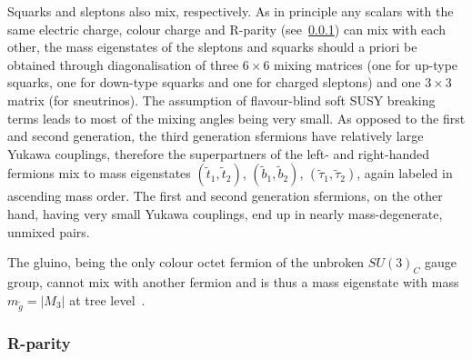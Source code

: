 %

Squarks and sleptons also mix, respectively. As in principle any scalars with the same electric charge, colour charge and R-parity (see~\cref{sec:rparity}) can mix with each other, the mass eigenstates of the sleptons and squarks should a priori be obtained through diagonalisation of three $6\times 6$ mixing matrices (one for up-type squarks, one for down-type squarks and one for charged sleptons) and one $3\times 3$ matrix (for sneutrinos). The assumption of flavour-blind soft SUSY breaking terms leads to most of the mixing angles being very small. As opposed to the first and second generation, the third generation sfermions have relatively large Yukawa couplings, therefore the superpartners of the left- and right-handed fermions mix to mass eigenstates $(\tilde{t}_1,\tilde{t}_2)$, $(\tilde{b}_1,\tilde{b}_2)$, $(\tilde{\tau}_1,\tilde{\tau}_2)$, again labeled in ascending mass order. The first and second generation sfermions, on the other hand, having very small Yukawa couplings, end up in nearly mass-degenerate, unmixed pairs.

The gluino, being the only colour octet fermion of the unbroken $SU(3)_C$ gauge group, cannot mix with another fermion and is thus a mass eigenstate with mass $m_{\tilde{g}} = \vert M_3 \vert$ at tree level~\cite{Martin:1997ns,baer_tata_2006}.

\subsubsection{R-parity}\label{sec:rparity}

